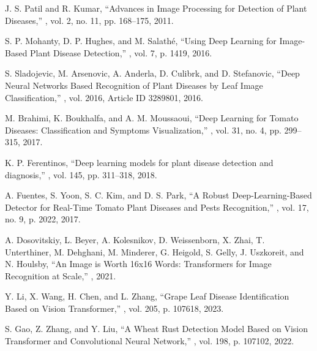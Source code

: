 \documentclass[preprint,12pt]{elsarticle}
\begin{document}
\begin{thebibliography}{99}

J. S. Patil and R. Kumar,
\newblock ``Advances in Image Processing for Detection of Plant Diseases,''
, vol. 2, no. 11, pp. 168–175, 2011.

S. P. Mohanty, D. P. Hughes, and M. Salathé,
\newblock ``Using Deep Learning for Image-Based Plant Disease Detection,''
, vol. 7, p. 1419, 2016.

S. Sladojevic, M. Arsenovic, A. Anderla, D. Culibrk, and D. Stefanovic,
\newblock ``Deep Neural Networks Based Recognition of Plant Diseases by Leaf Image Classification,''
, vol. 2016, Article ID 3289801, 2016.

M. Brahimi, K. Boukhalfa, and A. M. Moussaoui,
\newblock ``Deep Learning for Tomato Diseases: Classification and Symptoms Visualization,''
, vol. 31, no. 4, pp. 299–315, 2017.

K. P. Ferentinos,
\newblock ``Deep learning models for plant disease detection and diagnosis,''
, vol. 145, pp. 311–318, 2018.

A. Fuentes, S. Yoon, S. C. Kim, and D. S. Park,
\newblock ``A Robust Deep-Learning-Based Detector for Real-Time Tomato Plant Diseases and Pests Recognition,''
, vol. 17, no. 9, p. 2022, 2017.

A. Dosovitskiy, L. Beyer, A. Kolesnikov, D. Weissenborn, X. Zhai, T. Unterthiner, M. Dehghani, M. Minderer, G. Heigold, S. Gelly, J. Uszkoreit, and N. Houlsby,
\newblock ``An Image is Worth 16x16 Words: Transformers for Image Recognition at Scale,''
, 2021.

Y. Li, X. Wang, H. Chen, and L. Zhang,
\newblock ``Grape Leaf Disease Identification Based on Vision Transformer,''
, vol. 205, p. 107618, 2023.

S. Gao, Z. Zhang, and Y. Liu,
\newblock ``A Wheat Rust Detection Model Based on Vision Transformer and Convolutional Neural Network,''
, vol. 198, p. 107102, 2022.


\end{thebibliography}
\end{document}
